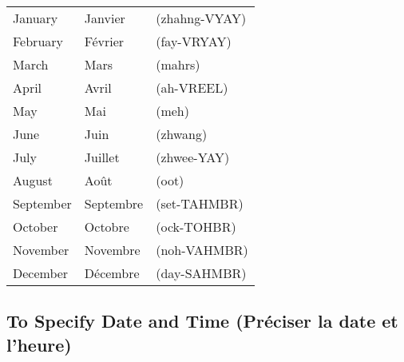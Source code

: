\begin{tabular}{| l | l | l |}
\hline
January     & Janvier       & (zhahng-VYAY) \\
February    & F\'evrier     & (fay-VRYAY)   \\
March       & Mars          & (mahrs)       \\
April       & Avril         & (ah-VREEL)    \\
May         & Mai           & (meh)         \\
June        & Juin          & (zhwang)      \\
July        & Juillet       & (zhwee-YAY)   \\
August      & Ao\^ut        & (oot)         \\
September   & Septembre     & (set-TAHMBR)  \\
October     & Octobre       & (ock-TOHBR)   \\
November    & Novembre      & (noh-VAHMBR)  \\
December    & D\'ecembre    & (day-SAHMBR)  \\
\hline
\end{tabular}

\subsection{To Specify Date and Time (Pr\'eciser la date et l'heure)}

